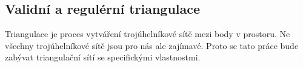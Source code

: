 \documentclass[12pt,a4paper]{article}
\begin{document}
\begin{figure}[h!]
\centering
\begin{floatrow}
\end{floatrow}
\end{figure}

\newpage
\subsection{Validní a regulérní triangulace}

Triangulace je proces vytváření trojúhelníkové
sítě mezi body v prostoru. Ne všechny trojúhelníkové sítě jsou pro nás ale zajímavé. Proto se tato práce bude zabývat triangulační
sítí se specifickými vlastnostmi.
\end{document}
